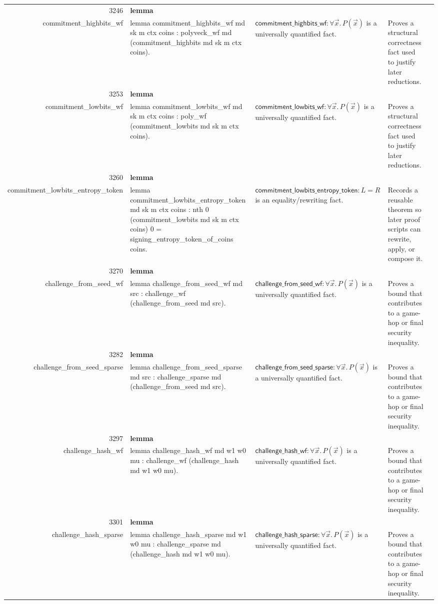 \documentclass[10pt]{article}
\newcommand{\ec}[1]{\begingroup\ttfamily\scriptsize #1\endgroup}
\begin{document}
\begin{longtable}{r L{0.17\textwidth} L{0.26\textwidth} L{0.27\textwidth} L{0.20\textwidth}}
3246 & \textbf{lemma}\\\ec{commitment\_highbits\_wf} & \ec{lemma commitment\_highbits\_wf md sk m ctx coins : polyveck\_wf md (commitment\_highbits md sk m ctx coins).} & \(\mathsf{commitment\_highbits\_wf} : \forall \vec{x}.\, P(\vec{x})\) is a universally quantified fact. & Proves a structural correctness fact used to justify later reductions. \\
3253 & \textbf{lemma}\\\ec{commitment\_lowbits\_wf} & \ec{lemma commitment\_lowbits\_wf md sk m ctx coins : poly\_wf (commitment\_lowbits md sk m ctx coins).} & \(\mathsf{commitment\_lowbits\_wf} : \forall \vec{x}.\, P(\vec{x})\) is a universally quantified fact. & Proves a structural correctness fact used to justify later reductions. \\
3260 & \textbf{lemma}\\\ec{commitment\_lowbits\_entropy\_token} & \ec{lemma commitment\_lowbits\_entropy\_token md sk m ctx coins : nth 0 (commitment\_lowbits md sk m ctx coins) 0 = signing\_entropy\_token\_of\_coins coins.} & \(\mathsf{commitment\_lowbits\_entropy\_token} : L = R\) is an equality/rewriting fact. & Records a reusable theorem so later proof scripts can rewrite, apply, or compose it. \\
3270 & \textbf{lemma}\\\ec{challenge\_from\_seed\_wf} & \ec{lemma challenge\_from\_seed\_wf md src : challenge\_wf (challenge\_from\_seed md src).} & \(\mathsf{challenge\_from\_seed\_wf} : \forall \vec{x}.\, P(\vec{x})\) is a universally quantified fact. & Proves a bound that contributes to a game-hop or final security inequality. \\
3282 & \textbf{lemma}\\\ec{challenge\_from\_seed\_sparse} & \ec{lemma challenge\_from\_seed\_sparse md src : challenge\_sparse md (challenge\_from\_seed md src).} & \(\mathsf{challenge\_from\_seed\_sparse} : \forall \vec{x}.\, P(\vec{x})\) is a universally quantified fact. & Proves a bound that contributes to a game-hop or final security inequality. \\
3297 & \textbf{lemma}\\\ec{challenge\_hash\_wf} & \ec{lemma challenge\_hash\_wf md w1 w0 mu : challenge\_wf (challenge\_hash md w1 w0 mu).} & \(\mathsf{challenge\_hash\_wf} : \forall \vec{x}.\, P(\vec{x})\) is a universally quantified fact. & Proves a bound that contributes to a game-hop or final security inequality. \\
3301 & \textbf{lemma}\\\ec{challenge\_hash\_sparse} & \ec{lemma challenge\_hash\_sparse md w1 w0 mu : challenge\_sparse md (challenge\_hash md w1 w0 mu).} & \(\mathsf{challenge\_hash\_sparse} : \forall \vec{x}.\, P(\vec{x})\) is a universally quantified fact. & Proves a bound that contributes to a game-hop or final security inequality. \\

\end{longtable}
\end{document}
